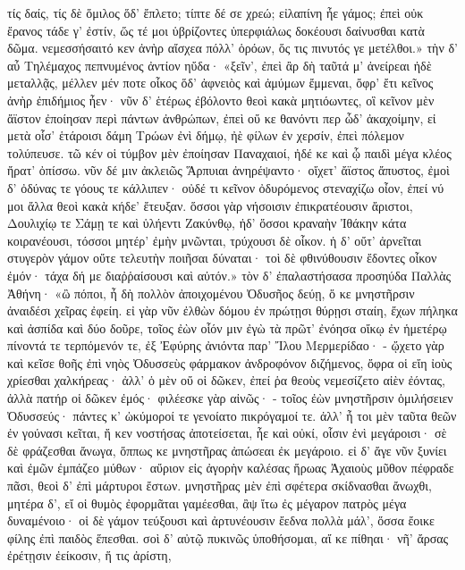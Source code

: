 τίς δαίς, τίς δὲ ὅμιλος ὅδ' ἔπλετο; τίπτε δέ σε χρεώ;
εἰλαπίνη ἦε γάμος; ἐπεὶ οὐκ ἔρανος τάδε γ' ἐστίν,
ὥς τέ μοι ὑβρίζοντες ὑπερφιάλως δοκέουσι
δαίνυσθαι κατὰ δῶμα. νεμεσσήσαιτό κεν ἀνὴρ
αἴσχεα πόλλ' ὁρόων, ὅς τις πινυτός γε μετέλθοι.»
\nstanza
τὴν δ' αὖ Τηλέμαχος πεπνυμένος ἀντίον ηὔδα·    
«ξεῖν', ἐπεὶ ἂρ δὴ ταῦτά μ' ἀνείρεαι ἠδὲ μεταλλᾷς,
μέλλεν μέν ποτε οἶκος ὅδ' ἀφνειὸς καὶ ἀμύμων
ἔμμεναι, ὄφρ' ἔτι κεῖνος ἀνὴρ ἐπιδήμιος ἦεν·
νῦν δ' ἑτέρως ἐβόλοντο θεοὶ κακὰ μητιόωντες,
οἳ κεῖνον μὲν ἄϊστον ἐποίησαν περὶ πάντων
ἀνθρώπων, ἐπεὶ οὔ κε θανόντι περ ὧδ' ἀκαχοίμην,
εἰ μετὰ οἷσ' ἑτάροισι δάμη Τρώων ἐνὶ δήμῳ,
ἠὲ φίλων ἐν χερσίν, ἐπεὶ πόλεμον τολύπευσε.
τῶ κέν οἱ τύμβον μὲν ἐποίησαν Παναχαιοί,
ἠδέ κε καὶ ᾧ παιδὶ μέγα κλέος ἤρατ' ὀπίσσω.    
νῦν δέ μιν ἀκλειῶς Ἅρπυιαι ἀνηρέψαντο·
οἴχετ' ἄϊστος ἄπυστος, ἐμοὶ δ' ὀδύνας τε γόους τε
κάλλιπεν· οὐδέ τι κεῖνον ὀδυρόμενος στεναχίζω
οἶον, ἐπεί νύ μοι ἄλλα θεοὶ κακὰ κήδε' ἔτευξαν.
ὅσσοι γὰρ νήσοισιν ἐπικρατέουσιν ἄριστοι,
Δουλιχίῳ τε Σάμῃ τε καὶ ὑλήεντι Ζακύνθῳ,
ἠδ' ὅσσοι κραναὴν Ἰθάκην κάτα κοιρανέουσι,
τόσσοι μητέρ' ἐμὴν μνῶνται, τρύχουσι δὲ οἶκον.
ἡ δ' οὔτ' ἀρνεῖται στυγερὸν γάμον οὔτε τελευτὴν
ποιῆσαι δύναται· τοὶ δὲ φθινύθουσιν ἔδοντες    
οἶκον ἐμόν· τάχα δή με διαῤῥαίσουσι καὶ αὐτόν.»
\nstanza
τὸν δ' ἐπαλαστήσασα προσηύδα Παλλὰς Ἀθήνη·
«ὢ πόποι, ἦ δὴ πολλὸν ἀποιχομένου Ὀδυσῆος
δεύῃ, ὅ κε μνηστῆρσιν ἀναιδέσι χεῖρας ἐφείη.
εἰ γὰρ νῦν ἐλθὼν δόμου ἐν πρώτῃσι θύρῃσι
σταίη, ἔχων πήληκα καὶ ἀσπίδα καὶ δύο δοῦρε,
τοῖος ἐὼν οἷόν μιν ἐγὼ τὰ πρῶτ' ἐνόησα
οἴκῳ ἐν ἡμετέρῳ πίνοντά τε τερπόμενόν τε,
\nstanza
ἐξ Ἐφύρης ἀνιόντα παρ' Ἴλου Μερμερίδαο· -
ᾤχετο γὰρ καὶ κεῖσε θοῆς ἐπὶ νηὸς Ὀδυσσεὺς    
φάρμακον ἀνδροφόνον διζήμενος, ὄφρα οἱ εἴη
ἰοὺς χρίεσθαι χαλκήρεας· ἀλλ' ὁ μὲν οὔ οἱ
δῶκεν, ἐπεί ῥα θεοὺς νεμεσίζετο αἰὲν ἐόντας,
ἀλλὰ πατήρ οἱ δῶκεν ἐμός· φιλέεσκε γὰρ αἰνῶς· -
τοῖος ἐὼν μνηστῆρσιν ὁμιλήσειεν Ὀδυσσεύς·
πάντες κ' ὠκύμοροί τε γενοίατο πικρόγαμοί τε.
ἀλλ' ἦ τοι μὲν ταῦτα θεῶν ἐν γούνασι κεῖται,
ἤ κεν νοστήσας ἀποτείσεται, ἦε καὶ οὐκί,
οἷσιν ἐνὶ μεγάροισι· σὲ δὲ φράζεσθαι ἄνωγα,
ὅππως κε μνηστῆρας ἀπώσεαι ἐκ μεγάροιο.    
εἰ δ' ἄγε νῦν ξυνίει καὶ ἐμῶν ἐμπάζεο μύθων·
αὔριον εἰς ἀγορὴν καλέσας ἥρωας Ἀχαιοὺς
μῦθον πέφραδε πᾶσι, θεοὶ δ' ἐπὶ μάρτυροι ἔστων.
μνηστῆρας μὲν ἐπὶ σφέτερα σκίδνασθαι ἄνωχθι,
μητέρα δ', εἴ οἱ θυμὸς ἐφορμᾶται γαμέεσθαι,
ἂψ ἴτω ἐς μέγαρον πατρὸς μέγα δυναμένοιο·
οἱ δὲ γάμον τεύξουσι καὶ ἀρτυνέουσιν ἔεδνα
πολλὰ μάλ', ὅσσα ἔοικε φίλης ἐπὶ παιδὸς ἕπεσθαι.
σοὶ δ' αὐτῷ πυκινῶς ὑποθήσομαι, αἴ κε πίθηαι·
νῆ' ἄρσας ἐρέτῃσιν ἐείκοσιν, ἥ τις ἀρίστη,    
